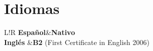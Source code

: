 \documentclass[10pt]{article}
\newcommand\VRule{\color{lightgray}\vrule width 0.5pt}
\begin{document}

\section*{Idiomas}

\begin{tabular}{L!{\VRule}R}
{\bf Español}&{\bf Nativo}\\
{\bf Inglés} &{\bf B2} (First Certificate in English 2006)\\
\end{tabular}
\end{document}
